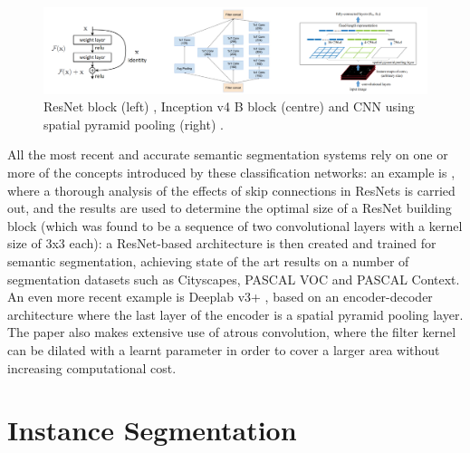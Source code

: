 \documentclass[12pt,twoside]{report}
\begin{document}
\begin{figure}[ht]%
\centering
\includegraphics[width = 1.05\hsize]{./figures/skip-connections}
\caption{ResNet block (left) \cite{resnet}, Inception v4 B block (centre) \cite{inceptionv4} and CNN using spatial pyramid pooling (right) \cite{spp}.}
\label{fig:skip-connections}
\end{figure}

All the most recent and accurate semantic segmentation systems rely on one or more of the concepts introduced by these classification networks: an example is \cite{revisitingresnets}, where a thorough analysis of the effects of skip connections in ResNets is carried out, and the results are used to determine the optimal size of a ResNet building block (which was found to be a sequence of two convolutional layers with a kernel size of 3x3 each): a ResNet-based architecture is then created and trained for semantic segmentation, achieving state of the art results on a number of segmentation datasets such as Cityscapes, PASCAL VOC and PASCAL Context. An even more recent example is Deeplab v3+ \cite{deeplabv3+}, based on an encoder-decoder architecture where the last layer of the encoder is a spatial pyramid pooling layer. The paper also makes extensive use of atrous convolution, where the filter kernel can be dilated with a learnt parameter in order to cover a larger area without increasing computational cost.


\section{Instance Segmentation}
\end{document}
